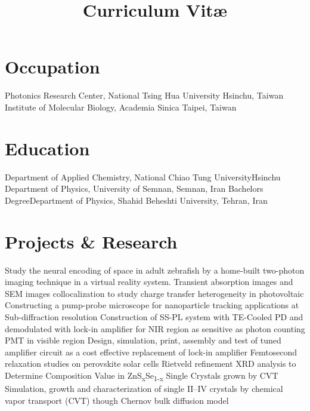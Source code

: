 \documentclass[11pt,a4paper, nolmodern]{moderncv}
\title{Curriculum Vit\ae}
\begin{document}
\makecvtitle
\vspace{-1.5cm}
\section{Occupation}
		{Photonics Research Center, National Tsing Hua University}
		{Hsinchu, Taiwan}{}{}
		{Institute of Molecular Biology, Academia Sinica}
		{Taipei, Taiwan}{}{}
\section{Education}
		{Department of Applied Chemistry, National Chiao
		Tung University}{Hsinchu}{}{}
		{Department of Physics, University of Semnan, Semnan, Iran}{}{}{}
		{Bachelors Degree}{Department of Physics, Shahid 
		Beheshti University, Tehran, Iran}{}{}{}
\section{Projects \& Research}
		{Study the neural encoding of space in adult zebrafish 
		by a home-built two-photon 
		imaging technique in a virtual reality system.}
		{Transient absorption images and SEM images collocalization 
		to study charge transfer heterogeneity in photovoltaic}
		{Constructing a pump-probe microscope for nanoparticle tracking 
		applications at Sub-diffraction resolution}
		{Construction of SS-PL system with TE-Cooled PD 
		and demodulated with lock-in amplifier for NIR region as 
		sensitive as photon counting PMT in visible region}
		{Design, simulation, print, assembly and test 
		of tuned amplifier circuit as a cost effective replacement 
		of lock-in amplifier}
		{Femtosecond relaxation studies on perovskite solar cells}
		{Rietveld refinement XRD analysis to 
		Determine Composition Value in ZnS\textsubscript{x}Se\textsubscript{1-x} 
		Single Crystals grown by CVT}
		{Simulation, growth and characterization 
		of single II--IV crystals 
		by chemical vapor transport (CVT) though Chernov bulk diffusion model}
\end{document}
